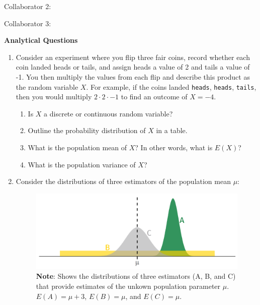 \documentclass[11pt]{article}
\begin{document}
\begin{onehalfspacing}
Collaborator 2: \\
			\vspace{0.1in}

Collaborator 3:
			

\newpage


\begin{center}
\textbf{Analytical Questions} \bigskip
\end{center}


\begin{enumerate}
	
\item Consider an experiment where you flip three fair coins, record whether each coin landed heads or tails, and assign heads a value of 2 and tails a value of -1. You then multiply the values from each flip and describe this product as the random variable $X$. For example, if the coins landed \texttt{heads}, \texttt{heads}, \texttt{tails}, then you would multiply $2 \cdot 2 \cdot -1$ to find an outcome of $X = -4$.
\begin{enumerate}[label=(\alph*)]
	\item Is $X$ a discrete or continuous random variable?
	\item Outline the probability distribution of $X$ in a table.
	\item What is the population mean of $X$? In other words, what is $E(X)$?
	\item What is the population variance of $X$?
\end{enumerate}

\bigskip

\item Consider the distributions of three estimators of the population mean $\mu$:

\begin{figure}[H]
	\centering
	\includegraphics[width=\textwidth]{estimators.png}
	\caption*{\textbf{Note}: Shows the distributions of three estimators (A, B, and C) that provide estimates of the unkown population parameter $\mu$. $E(A) = \mu + 3$,  $E(B) = \mu$, and  $E(C) = \mu$.}
\end{figure}


\end{enumerate}
\end{onehalfspacing}
\end{document}
